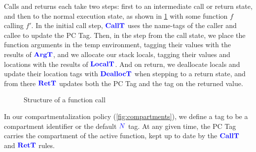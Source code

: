 \documentclass{llncs}
\begin{document}
Calls and returns each take two steps: first to an intermediate call or return state, and
then to the normal execution state, as shown in \cref{fig:functions} with some function \(f\)
calling \(f'\). In the initial call step, \(\color{blue} \mathbf{CallT}\)
uses the name-tags of the caller and callee to update the PC Tag. Then, in the step from the call
state, we place the function arguments in the temp environment, tagging their values with
the results of \(\color{blue} \mathbf{ArgT}\), and we allocate our stack locals, tagging their values and locations
with the results of \(\color{blue} \mathbf{LocalT}\). And on return, we deallocate locals and update their location
tags with \(\color{blue} \mathbf{DeallocT}\) when stepping to a return state, and from there \(\color{blue} \mathbf{RetT}\) updates both
the PC Tag and the tag on the returned value.

\begin{figure}

  \caption{Structure of a function call}
  \label{fig:functions}
\end{figure}

In our compartmentalization policy (\cref{fig:compartments}), we define a tag to be a compartment
identifier or the default \({\color{blue} N}\) tag. At any given time, the PC Tag carries the compartment of the
active function, kept up to date by the \(\color{blue} \mathbf{CallT}\) and \(\color{blue} \mathbf{RetT}\) rules.
\end{document}
